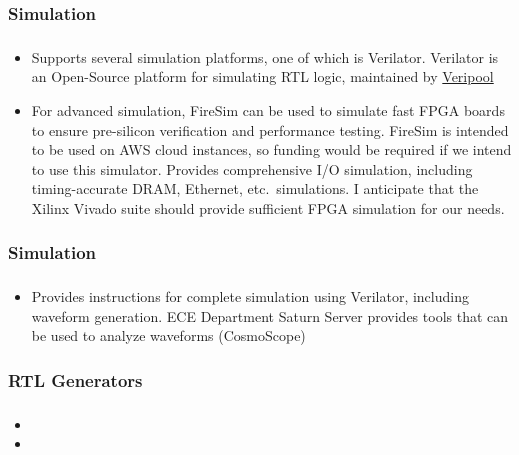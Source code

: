 \documentclass{weeklyslides}
\begin{document}
\subsubsection{Simulation}\label{subsubsec:Simulation}
\begin{frame}
  \frametitle{}
  \begin{itemize}
  \item Supports several simulation platforms, one of which is Verilator.
    Verilator is an Open-Source platform for simulating RTL logic, maintained by \href{https://www.veripool.org/}{Veripool}
  \item For advanced simulation, FireSim can be used to simulate fast FPGA boards to ensure pre-silicon verification and performance testing.
    FireSim is intended to be used on AWS cloud instances, so funding would be required if we intend to use this simulator.
    Provides comprehensive I/O simulation, including timing-accurate DRAM, Ethernet, etc.\ simulations.
    I anticipate that the Xilinx Vivado suite should provide sufficient FPGA simulation for our needs.
  \end{itemize}
\end{frame}

\subsubsection{Simulation}
\begin{frame}
  \frametitle{}
  \begin{itemize}
  \item Provides instructions for complete simulation using Verilator, including waveform generation. ECE Department Saturn Server provides tools that can be used to analyze waveforms (CosmoScope)
  \end{itemize}
\end{frame}


\subsubsection{RTL Generators}\label{subsubsec:RTL Generators}
\begin{frame}
  \frametitle{}
  \begin{itemize}
  \item
  \item
  \end{itemize}
\end{frame}
\end{document}
